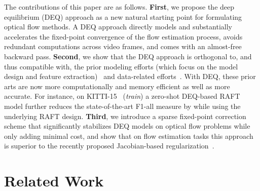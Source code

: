 \documentclass[10pt,twocolumn,letterpaper]{article}
\begin{document}
The contributions of this paper are as follows. 
\textbf{First}, we propose the deep equilibrium (DEQ) approach as a new natural starting point for formulating optical flow methods. A DEQ approach directly models and substantially accelerates the fixed-point convergence of the flow estimation process, avoids redundant computations across video frames, and comes with an almost-free backward pass.
\textbf{Second}, we show that the DEQ approach is orthogonal to, and thus compatible with, the prior modeling efforts (which focus on the model design and feature extraction)~\cite{RAFT,GMA} and data-related efforts~\cite{autoflow}. With DEQ, these prior arts are now more computationally and memory efficient as well as more accurate. For instance, on KITTI-15~\cite{kitti} (\emph{train}) a zero-shot DEQ-based RAFT model further reduces the state-of-the-art F1-all measure by  while using the underlying RAFT design.
\textbf{Third}, we introduce a sparse fixed-point correction scheme that significantly stabilizes DEQ models on optical flow problems while only adding minimal cost, and show that on flow estimation tasks this approach is superior to the recently proposed Jacobian-based regularization~\cite{DEQ_JR}.


\section{Related Work}
\label{sec:related_work}
\end{document}
